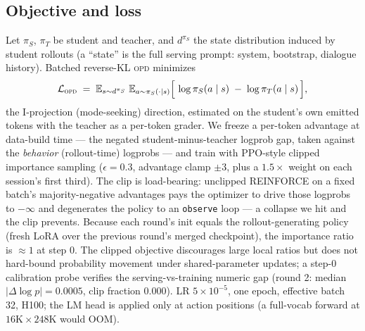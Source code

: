 \documentclass[11pt]{article}
\newcommand{\opd}{\textsc{opd}}
\begin{document}
\subsection{Objective and loss}
Let $\pi_S$, $\pi_T$ be student and teacher, and $d^{\pi_S}$ the state distribution induced by
student rollouts (a ``state'' is the full serving prompt: system, bootstrap, dialogue history).
Batched reverse-KL \opd{} minimizes
\begin{equation}
\mathcal{L}_{\textsc{opd}}
 \;=\; \mathbb{E}_{s \sim d^{\pi_S}}\;
 \mathbb{E}_{a \sim \pi_S(\cdot \mid s)}
 \Big[\, \log \pi_S(a \mid s) \;-\; \log \pi_T(a \mid s) \,\Big],
\label{eq:opd}
\end{equation}
the I-projection (mode-seeking) direction, estimated on the student's own emitted tokens with the
teacher as a per-token grader. We freeze a per-token advantage at data-build time --- the negated
student-minus-teacher logprob gap, taken against the \emph{behavior} (rollout-time) logprobs ---
and train with PPO-style clipped importance sampling ($\epsilon{=}0.3$, advantage clamp $\pm 3$,
plus a $1.5\times$ weight on each session's first third). The clip is load-bearing: unclipped
REINFORCE on a fixed batch's majority-negative advantages pays the optimizer to drive those
logprobs to $-\infty$ and degenerates the policy to an \texttt{observe} loop --- a collapse we
hit and the clip prevents. Because each round's init equals the rollout-generating policy
(fresh LoRA over the previous round's merged checkpoint), the importance ratio is $\approx 1$ at
step 0. The clipped objective discourages large local ratios but does not hard-bound probability
movement under shared-parameter updates; a step-0 calibration probe
verifies the serving-vs-training numeric gap (round 2: median $|{\Delta}\log p| = 0.0005$, clip
fraction $0.000$). LR $5\times10^{-5}$, one epoch, effective batch 32, H100; the LM head is
applied only at action positions (a full-vocab forward at $16\mathrm{K}\times 248\mathrm{K}$
would OOM).
\end{document}
